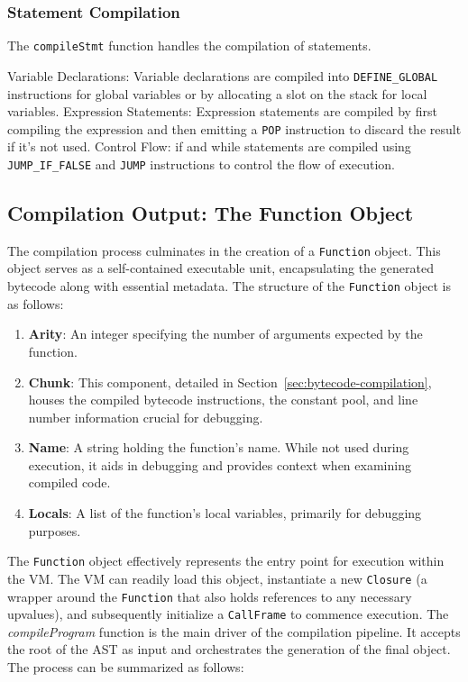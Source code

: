 \subsubsection{Statement Compilation}

The \texttt{compileStmt} function handles the compilation of statements.

Variable Declarations: Variable declarations are compiled into \texttt{DEFINE\_GLOBAL} instructions for global 
variables or by allocating a slot on the stack for local variables.
Expression Statements: Expression statements are compiled by first compiling the expression and then emitting a \texttt{POP} instruction to discard the result if it's not used.
Control Flow: if and while statements are compiled using \texttt{JUMP\_IF\_FALSE} and \texttt{JUMP} instructions 
to control the flow of execution.

\subsection{Compilation Output: The Function Object}
\label{subsec:compilation-output}

The compilation process culminates in the creation of a \texttt{Function} object.
This object serves as a self-contained executable unit, encapsulating the generated bytecode along with essential metadata.
The structure of the \texttt{Function} object is as follows:

\begin{enumerate}
    \item \textbf{Arity}: An integer specifying the number of arguments expected by the function.
    \item \textbf{Chunk}: This component, detailed in Section~\ref{sec:bytecode-compilation}, houses the compiled bytecode instructions, the constant pool, and line number information crucial for debugging.
    \item \textbf{Name}: A string holding the function's name.
    While not used during execution, it aids in debugging and provides context when examining compiled code.
    \item \textbf{Locals}: A list of the function's local variables, primarily for debugging purposes.
\end{enumerate}
The \texttt{Function} object effectively represents the entry point for execution within the VM. The VM can readily load this object, instantiate a new \texttt{Closure} (a wrapper around the \texttt{Function} that also holds references to any necessary upvalues), and subsequently initialize a \texttt{CallFrame} to commence execution.
The \textit{compileProgram} function is the main driver of the compilation pipeline.
It accepts the root of the AST as input and orchestrates the generation of the final  object.
The process can be summarized as follows:

